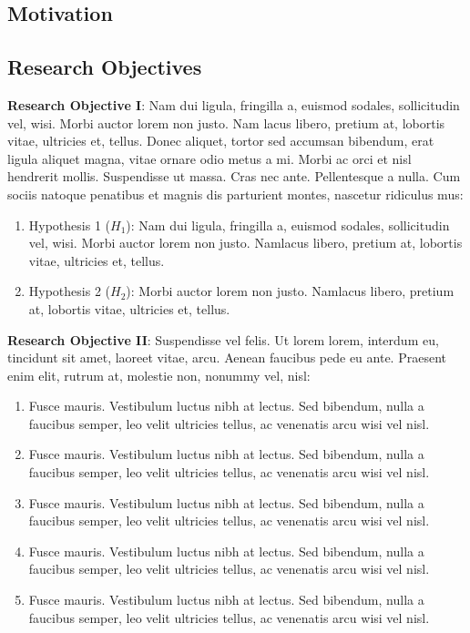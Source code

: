\documentclass{article}
\begin{document}
\subsection{Motivation}
\lipsum[3-6]


\subsection{Research Objectives}
\textbf{Research Objective I}: Nam dui ligula, fringilla a, euismod sodales, sollicitudin vel, wisi. Morbi auctor lorem non justo. Nam lacus libero, pretium at, lobortis vitae, ultricies et, tellus. Donec aliquet, tortor sed accumsan bibendum, erat ligula aliquet magna, vitae ornare odio metus a mi. Morbi ac orci et nisl hendrerit mollis. Suspendisse ut massa. Cras nec ante. Pellentesque a nulla. Cum sociis natoque penatibus et magnis dis parturient montes,
nascetur ridiculus mus:
    \begin{enumerate}

        \item Hypothesis 1 ($H_1$): Nam dui ligula, fringilla a, euismod sodales, sollicitudin vel, wisi. Morbi auctor lorem non justo. Namlacus libero, pretium at, lobortis vitae, ultricies et, tellus. 
        
        \item Hypothesis 2 ($H_2$): Morbi auctor lorem non justo. Namlacus libero, pretium at, lobortis vitae, ultricies et, tellus.
    
    \end{enumerate}

\noindent    
\textbf{Research Objective II}: Suspendisse vel felis. Ut lorem lorem, interdum eu, tincidunt sit amet, laoreet vitae, arcu. Aenean faucibus
pede eu ante. Praesent enim elit, rutrum at, molestie non, nonummy vel, nisl:

    \begin{enumerate}

        \item Fusce mauris. Vestibulum luctus nibh at lectus. Sed bibendum, nulla a faucibus semper, leo velit ultricies tellus, ac venenatis arcu wisi vel nisl.
        
        \item Fusce mauris. Vestibulum luctus nibh at lectus. Sed bibendum, nulla a faucibus semper, leo velit ultricies tellus, ac venenatis arcu wisi vel nisl.
        
        \item Fusce mauris. Vestibulum luctus nibh at lectus. Sed bibendum, nulla a faucibus semper, leo velit ultricies tellus, ac venenatis arcu wisi vel nisl.
        
        \item Fusce mauris. Vestibulum luctus nibh at lectus. Sed bibendum, nulla a faucibus semper, leo velit ultricies tellus, ac venenatis arcu wisi vel nisl.
        
        \item Fusce mauris. Vestibulum luctus nibh at lectus. Sed bibendum, nulla a faucibus semper, leo velit ultricies tellus, ac venenatis arcu wisi vel nisl.
    \end{enumerate}
    
\end{document}
